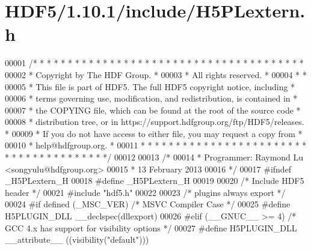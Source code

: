 \hypertarget{_h_d_f5_21_810_81_2include_2_h5_p_lextern_8h_source}{}\section{H\+D\+F5/1.10.1/include/\+H5\+P\+Lextern.h}
\label{_h_d_f5_21_810_81_2include_2_h5_p_lextern_8h_source}

\begin{DoxyCode}
00001 \textcolor{comment}{/* * * * * * * * * * * * * * * * * * * * * * * * * * * * * * * * * * * * * * *}
00002 \textcolor{comment}{ * Copyright by The HDF Group.                                               *}
00003 \textcolor{comment}{ * All rights reserved.                                                      *}
00004 \textcolor{comment}{ *                                                                           *}
00005 \textcolor{comment}{ * This file is part of HDF5. The full HDF5 copyright notice, including      *}
00006 \textcolor{comment}{ * terms governing use, modification, and redistribution, is contained in    *}
00007 \textcolor{comment}{ * the COPYING file, which can be found at the root of the source code       *}
00008 \textcolor{comment}{ * distribution tree, or in https://support.hdfgroup.org/ftp/HDF5/releases.  *}
00009 \textcolor{comment}{ * If you do not have access to either file, you may request a copy from     *}
00010 \textcolor{comment}{ * help@hdfgroup.org.                                                        *}
00011 \textcolor{comment}{ * * * * * * * * * * * * * * * * * * * * * * * * * * * * * * * * * * * * * * */}
00012 
00013 \textcolor{comment}{/*}
00014 \textcolor{comment}{ * Programmer:  Raymond Lu <songyulu@hdfgroup.org>}
00015 \textcolor{comment}{ *              13 February 2013}
00016 \textcolor{comment}{ */}
00017 \textcolor{preprocessor}{#ifndef \_H5PLextern\_H}
00018 \textcolor{preprocessor}{#define \_H5PLextern\_H}
00019 
00020 \textcolor{comment}{/* Include HDF5 header */}
00021 \textcolor{preprocessor}{#include "hdf5.h"}
00022 
00023 \textcolor{comment}{/* plugins always export */}
00024 \textcolor{preprocessor}{#if defined (\_MSC\_VER)  }\textcolor{comment}{/* MSVC Compiler Case */}\textcolor{preprocessor}{}
00025 \textcolor{preprocessor}{  #define H5PLUGIN\_DLL \_\_declspec(dllexport)}
00026 \textcolor{preprocessor}{#elif (\_\_GNUC\_\_ >= 4)  }\textcolor{comment}{/* GCC 4.x has support for visibility options */}\textcolor{preprocessor}{}
00027 \textcolor{preprocessor}{  #define H5PLUGIN\_DLL \_\_attribute\_\_ ((visibility("default")))}

\end{DoxyCode}
